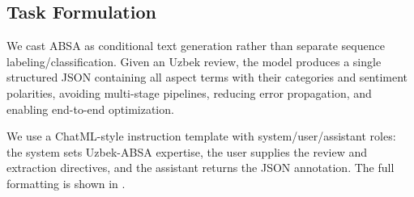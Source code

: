 \documentclass[computers,article,submit,pdftex,moreauthors]{Definitions/mdpi}
\begin{document}
\subsection{Task Formulation}
\label{sec:data_task}

We cast ABSA as conditional text generation rather than separate sequence labeling/classification. Given an Uzbek review, the model produces a single structured JSON containing all aspect terms with their categories and sentiment polarities, avoiding multi-stage pipelines, reducing error propagation, and enabling end-to-end optimization.

We use a ChatML-style instruction template with system/user/assistant roles: the system sets Uzbek-ABSA expertise, the user supplies the review and extraction directives, and the assistant returns the JSON annotation. The full formatting is shown in .
\end{document}
